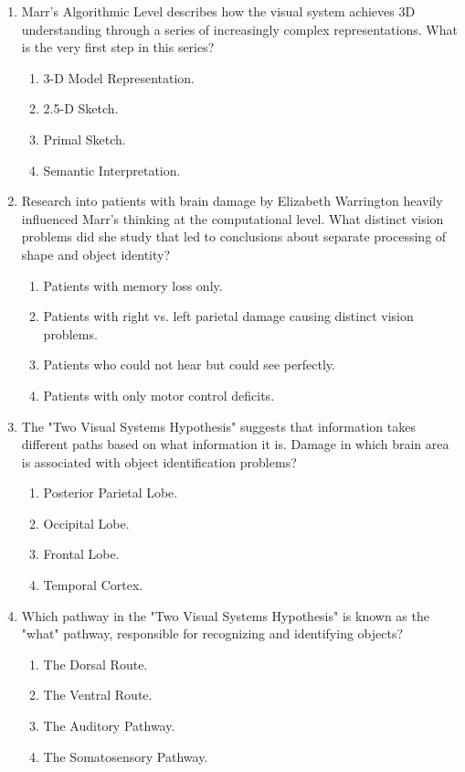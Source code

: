 \documentclass{article}
\begin{document}
\begin{enumerate}[label=\arabic*.]
\item Marr's Algorithmic Level describes how the visual system achieves 3D understanding through a series of increasingly complex representations. What is the very first step in this series?
\begin{enumerate}[label=(\alph*)]
    \item 3-D Model Representation.
    \item 2.5-D Sketch.
    \item Primal Sketch.
    \item Semantic Interpretation.
\end{enumerate}

\item Research into patients with brain damage by Elizabeth Warrington heavily influenced Marr's thinking at the computational level. What distinct vision problems did she study that led to conclusions about separate processing of shape and object identity?
\begin{enumerate}[label=(\alph*)]
    \item Patients with memory loss only.
    \item Patients with right vs. left parietal damage causing distinct vision problems.
    \item Patients who could not hear but could see perfectly.
    \item Patients with only motor control deficits.
\end{enumerate}

\item The "Two Visual Systems Hypothesis" suggests that information takes different paths based on what information it is. Damage in which brain area is associated with object identification problems?
\begin{enumerate}[label=(\alph*)]
    \item Posterior Parietal Lobe.
    \item Occipital Lobe.
    \item Frontal Lobe.
    \item Temporal Cortex.
\end{enumerate}

\item Which pathway in the "Two Visual Systems Hypothesis" is known as the "what" pathway, responsible for recognizing and identifying objects?
\begin{enumerate}[label=(\alph*)]
    \item The Dorsal Route.
    \item The Ventral Route.
    \item The Auditory Pathway.
    \item The Somatosensory Pathway.
\end{enumerate}


\end{enumerate}
\end{document}
